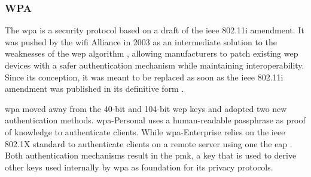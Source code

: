 \subsubsection{WPA}

The \gls{wpa} is a security protocol based on a draft of the \gls{ieee} 802.11i amendment. It was pushed by the \gls{wifi} Alliance in 2003 as an intermediate solution to the weaknesses of the \gls{wep} algorithm \cite{wifi_state}, allowing manufacturers to patch existing \gls{wep} devices with a safer authentication mechanism while maintaining interoperability. Since its conception, it was meant to be replaced as soon as the \gls{ieee} 802.11i amendment was published in its definitive form \cite{wpa_whitepaper}.

\gls{wpa} moved away from the 40-bit and 104-bit \gls{wep} keys and adopted two new authentication methods. \gls{wpa}-Personal uses a human-readable passphrase as proof of knowledge to authenticate clients. While \gls{wpa}-Enterprise relies on the \gls{ieee} 802.1X standard to authenticate clients on a remote server using one the \gls{eap} \cite{wpa_whitepaper}. Both authentication mechanisms result in the \gls{pmk}, a key that is used to derive other keys used internally by \gls{wpa} as foundation for its privacy protocols.




